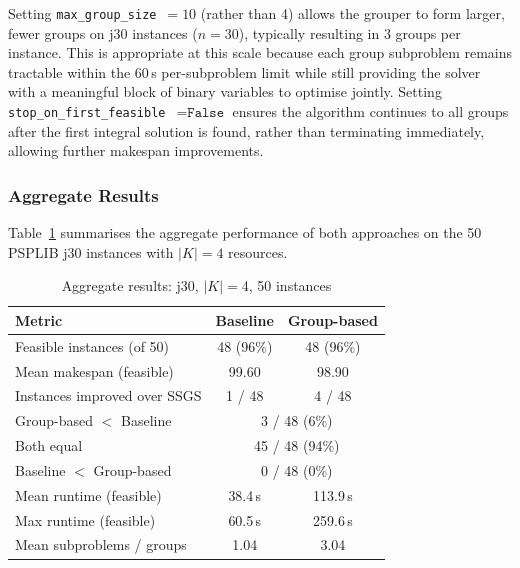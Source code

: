 \noindent
Setting \texttt{max\_group\_size}~$=10$ (rather than 4) allows
the grouper to form larger, fewer groups on j30 instances
($n=30$), typically resulting in 3 groups per instance. This is
appropriate at this scale because each group subproblem remains
tractable within the 60\,s per-subproblem limit while still
providing the solver with a meaningful block of binary variables
to optimise jointly. Setting \texttt{stop\_on\_first\_feasible}~$=
\texttt{False}$ ensures the algorithm continues to all groups
after the first integral solution is found, rather than
terminating immediately, allowing further makespan improvements.

\subsubsection*{Aggregate Results}

Table~\ref{tab:j30_k4_summary} summarises the aggregate
performance of both approaches on the 50 PSPLIB j30 instances
with $|K|=4$ resources.

\begin{table}[ht]
\centering
\renewcommand{\arraystretch}{1.35}
\caption{Aggregate results: j30, $|K|=4$, 50 instances}
\label{tab:j30_k4_summary}
\begin{tabular}{lcc}
\hline
\textbf{Metric} & \textbf{Baseline} & \textbf{Group-based} \\
\hline
Feasible instances (of 50)     & 48 (96\%)  & 48 (96\%)  \\
Mean makespan (feasible)        & 99.60      & 98.90      \\
Instances improved over SSGS    & 1 / 48     & 4 / 48     \\
Group-based $<$ Baseline        & \multicolumn{2}{c}{3 / 48 (6\%)}  \\
Both equal                      & \multicolumn{2}{c}{45 / 48 (94\%)} \\
Baseline $<$ Group-based        & \multicolumn{2}{c}{0 / 48 (0\%)}  \\
Mean runtime (feasible)         & 38.4\,s    & 113.9\,s   \\
Max runtime (feasible)          & 60.5\,s    & 259.6\,s   \\
Mean subproblems / groups       & 1.04       & 3.04       \\
\hline
\end{tabular}
\end{table}

